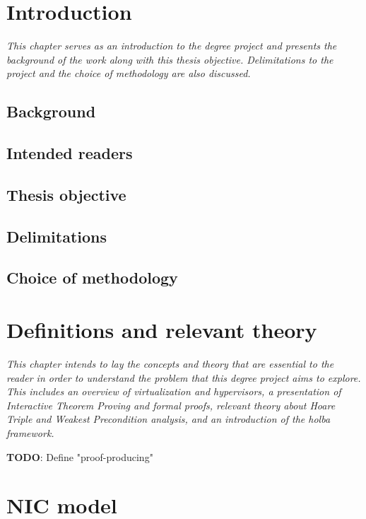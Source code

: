 \documentclass{kththesis}
\begin{document}
\printglossaries

\mainmatter %

\chapter{Introduction}
\textit{This chapter serves as an introduction to the degree project and presents the background of the work along with this thesis objective. Delimitations to the project and the choice of methodology are also discussed.}

\section{Background}

\section{Intended readers}

\section{Thesis objective}

\section{Delimitations}

\section{Choice of methodology}

\chapter{Definitions and relevant theory}
\textit{This chapter intends to lay the concepts and theory that are essential to the reader in order to understand the problem that this degree project aims to explore.  This includes an overview of virtualization and hypervisors, a presentation of Interactive Theorem Proving and formal proofs, relevant theory about Hoare Triple and Weakest Precondition analysis, and an introduction of the \gls{holba} framework.}

\textbf{TODO}: Define "proof-producing"

\chapter{NIC model} \label{nic-model}
%
%
%
\end{document}
